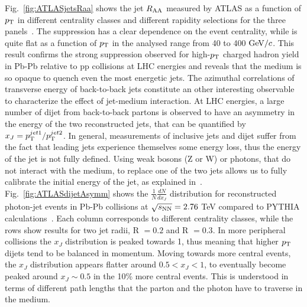 Fig.~\ref{fig:ATLASjetsRaa} shows the jet $R_{\rm AA}$ measured by ATLAS 
as a function of $p_{\rm T}$ in different centrality classes and different 
rapidity selections for the three panels~\cite{Aad:2014bxa}. The 
suppression has a clear dependence on the event centrality, while 
is quite flat as a function of $p_{\rm T}$ in the analysed range from 40 to 400 $\mathrm{GeV}/c$. 
This result confirms the strong suppression observed for high-$p_{\rm T}$ 
charged hadron yield in Pb-Pb relative to pp collisions at LHC energies and reveals that the 
medium is so opaque to quench even the most energetic jets. The 
azimuthal correlations of transverse energy of back-to-back jets 
constitute an other interesting observable to characterize the effect 
of jet-medium interaction. At LHC energies, a large number of dijet 
from back-to-back partons is observed to have an asymmetry in the energy 
of the two reconstructed jets, that can be quantified by 
$x_J = p_{\rm T}^{jet1}/p_{\rm T}^{jet2}$. 
In general, measurements of inclusive jets and dijet suffer from the fact that leading jets 
experience themselves some energy loss, thus the energy of the jet is not 
fully defined. Using weak bosons (Z or W) or photons, that do not interact 
with the medium, to replace one of the two jets allows us to fully calibrate the 
initial energy of the jet, as explained in~\cite{Wang:1996yh}. 
Fig.~\ref{fig:ATLASdijetAsymm} shows the $\frac{1}{N}\frac{dN}{dx_J}$ 
distribution for reconstructed photon-jet events in Pb-Pb collisions at $\sqrt{s_{\rm NN}} = 2.76$ TeV 
compared to PYTHIA calculations~\cite{ATLAS-CONF-2012-121}. 
Each column corresponds to different centrality classes, while the 
rows show results for two jet radii, R $= 0.2$ and R $=0.3$. In more 
peripheral collisions the $x_J$ distribution is peaked towards 1, thus 
meaning that higher $p_{\rm T}$ dijets tend to be balanced in momentum. 
Moving towards more central events, the $x_J$ distribution appears 
flatter around $0.5 < x_J<1$, to eventually become peaked around 
$x_J \sim 0.5$ in the 10\% more central events.
This is understood in terms of different path 
lengths that the parton and the photon have to traverse in the medium. 
